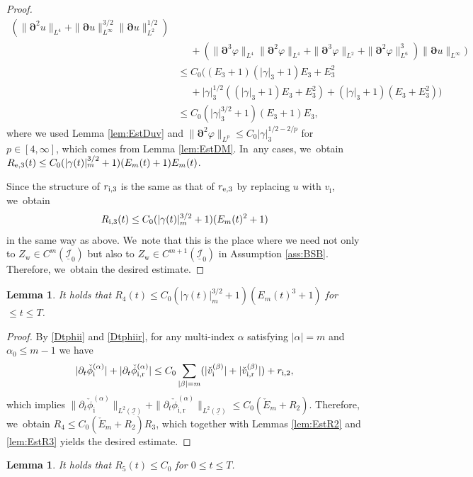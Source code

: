 \documentclass[JEP,XML,SOM,Unicode,NoFloatCountersInSection,published]{cedram}
\newcommand{\dt}{\partial_t}
\newcommand{\cI}{{\mathcal I}}
\newcommand{\ul}[1]{\underline{#1}}
\newtheorem{lemma}[theorem]{Lemma}
\theoremstyle{definition}
\begin{document}
\begin{proof}
\begin{align*}
(\|\bm{\partial}^2u\|_{L^4} + \|\bm{\partial}u\|_{L^\infty}^{3/2}\|\bm{\partial}u\|_{L^2}^{1/2}) \\
&\quad\;
+ (\|\bm{\partial}^3\varphi\|_{L^4}\|\bm{\partial}^2\varphi\|_{L^4} + \|\bm{\partial}^3\varphi\|_{L^2} + \|\bm{\partial}^2\varphi\|_{L^6}^3)
\|\bm{\partial}u\|_{L^\infty} \Bigr) \\
&\leq C_0 \bigl((E_3+1)(|\gamma|_3+1)E_3 + E_3^2 \\
&\quad\;
+ |\gamma|_3^{1/2}((|\gamma|_3+1)E_3 + E_3^2) + (|\gamma|_3+1)(E_3 + E_3^2) \bigr) \\
&\leq C_0(|\gamma|_3^{3/2}+1)(E_3+1)E_3,
\end{align*}
where we used Lemma \ref{lem:EstDuv} and $\|\bm{\partial}^2\varphi\|_{L^p} \leq C_0|\gamma|_3^{1/2-2/p}$ for $p\in[4,\infty]$,
which comes from Lemma \ref{lem:EstDM}. In~any cases, we~obtain $R_{{\rm e},3}(t) \leq C_0(|\gamma(t)|_m^{3/2}+1)(E_m(t)+1)E_m(t)$.

Since the structure of $r_{{\rm i},3}$ is the same as that of $r_{{\rm e},3}$ by replacing $u$ with $v_\mathrm{i}$, we~obtain
\[
R_{{\rm i},3}(t) \leq C_0(|\gamma(t)|_m^{3/2}+1)(E_m(t)^2+1)
\]
in the same way as above. We~note that this is the place where we need not only to $Z_\mathrm{w}\in C^m(\overline{\ul{\cI}_0})$
but also to $Z_\mathrm{w}\in C^{m+1}(\overline{\ul{\cI}_0})$ in Assumption \ref{ass:BSB}.
Therefore, we~obtain the desired estimate.
\end{proof}

\begin{lemma}\label{lem:EstR4}
It holds that $R_4(t) \leq C_0(|\gamma(t)|_m^{3/2}+1)(E_m(t)^3+1)$ for $\leq t\leq T$.
\end{lemma}

\begin{proof}
By \eqref{Dtphii} and \eqref{Dtphiir}, for any multi-index $\alpha$ satisfying $|\alpha|=m$ and $\alpha_0\leq m-1$ we have
\[
|\dt\check{\phi}_\mathrm{i}^{(\alpha)}| + |\dt\check{\phi}_\mathrm{i,r}^{(\alpha)}|
\leq C_0\sum_{|\beta|=m} (|\check{v}_\mathrm{i}^{(\beta)}| + |\check{v}_\mathrm{i,r}^{(\beta)}|) + r_{{\rm i},2},
\]
which implies
$\|\dt\check{\phi}_\mathrm{i}^{(\alpha)}\|_{L^2(\ul{\cI})} + \|\dt\check{\phi}_\mathrm{i,r}^{(\alpha)}\|_{L^2(\ul{\cI})}\leq C_0(\check{E}_m + R_2)$.
Therefore, we~obtain $R_4 \leq C_0 (\check{E}_m + R_2)R_3$, which together with Lemmas \ref{lem:EstR2} and \ref{lem:EstR3} yields the desired estimate.
\end{proof}

\begin{lemma}\label{lem:EstR5}
It holds that $R_5(t) \leq C_0$ for $0\leq t\leq T$.
\end{lemma}
\end{document}
